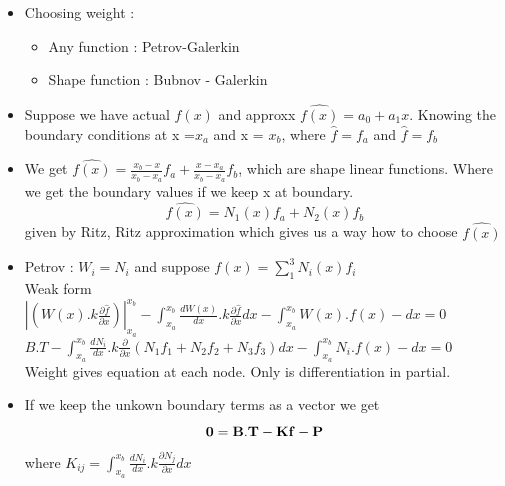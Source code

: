 	\begin{frame}
		\begin{itemize}
			\item Choosing weight :
				\begin{itemize}
					\item Any function : Petrov-Galerkin
					\item Shape function : Bubnov - Galerkin
				\end{itemize}
			\item  Suppose we have actual $f(x)$ and approxx $\hat{f(x)} = a_0 + a_1x$. Knowing the boundary conditions at x =$x_a$ and x = $x_b$, where $\hat{f}= f_a$ and $\hat{f}=f_b$
			\item We get $\hat{f(x)} = \frac{x_b-x}{x_b-x_a} f_a + \frac{x - x_a}{x_b-x_a} f_b$, which are shape linear functions. Where we get the boundary values if we keep x at boundary. \\
			\begin{equation}
				\hat{f(x)} = N_1(x) f_a + N_2(x)f_b
			\end{equation}
			given by Ritz, Ritz approximation which gives us a way how to choose $\hat{f(x)}$
			\item Petrov : $W_i = N_i$ and suppose $\hat{f(x)} = \sum_{1}^{3} N_i(x)f_i$ \\
			Weak form \\
			$\left|\left(W(x).k \frac{\partial \hat{f}}{\partial x} \right) \right|^{x_b}_{x_a}- \int_{x_a}^{x_b} \frac{dW(x)}{dx}.k \frac{\partial \hat{f}}{\partial x} dx -  \int_{x_a}^{x_b} W(x).f(x) - dx = 0$ \\
			$B.T - \int_{x_a}^{x_b} \frac{dN_i}{dx}.k \frac{\partial }{\partial x}(N_1f_1 + N_2f_2+N_3f_3) dx -  \int_{x_a}^{x_b} N_i.f(x) - dx = 0$ \\
			
			Weight gives equation at each node. 
			Only is differentiation in partial. 
			\item If we keep the unkown boundary terms as a vector we get
			\begin{equation}
			\mathbf{0 = B.T - Kf - P}
			\end{equation} 
			where $K_{ij} = \int_{x_a}^{x_b} \frac{dN_i}{dx}.k \frac{\partial N_j }{\partial x} dx$
		\end{itemize}
	\end{frame}



